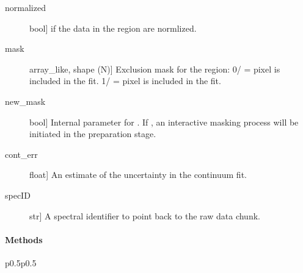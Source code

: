 \documentclass[letterpaper,10pt,english]{sphinxmanual}
\begin{document}
\begin{fulllineitems}
\begin{description}
\item[{normalized}] \leavevmode{[}bool{]}
 if the data in the region are normlized.

\item[{mask}] \leavevmode{[}array\_like, shape (N){]}
Exclusion mask for the region:
0/ = pixel is  included in the fit.
1/ = pixel is included in the fit.

\item[{new\_mask}] \leavevmode{[}bool{]}
Internal parameter for {\hyperref[\detokenize{api:VoigtFit.DataSet.prepare_dataset}]{}}.
If , an interactive masking process will be initiated in the
preparation stage.

\item[{cont\_err}] \leavevmode{[}float{]}
An estimate of the uncertainty in the continuum fit.

\item[{specID}] \leavevmode{[}str{]}
A spectral identifier to point back to the raw data chunk.

\end{description}
\paragraph{Methods}


\begin{savenotes}\sphinxatlongtablestart\begin{longtable}{p{0.5\linewidth}p{0.5\linewidth}}
\hline

\endfirsthead

%
{}\\
\hline

\endhead

\hline
{}\\
\endfoot

\endlastfoot


\end{longtable}
\end{savenotes}
\end{fulllineitems}
\end{document}
